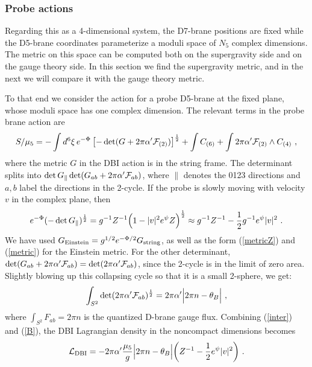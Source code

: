\documentclass[a4paper,12pt]{article}
\renewcommand{\=}[1]{\bar{#1}}
\begin{document}
\subsubsection{Probe actions}

Regarding this as a 4-dimensional system, the D7-brane positions are fixed while
the D5-brane coordinates parameterize a moduli space of
$N_5$ complex dimensions.  The metric on this
space can be computed both on the supergravity side and on the gauge theory
side.
In this section we find the supergravity metric, and in the next we will compare
it with the gauge theory metric.

To that end we consider the action for a probe D5-brane at the fixed plane,
whose moduli space has one complex dimension. The relevant terms in the
probe brane
action are
\begin{equation}
S/\mu_5 =- \int d^6\xi\, e^{-\Phi}\left[-\det(G+2\pi\alpha'{\cal
F}_{(2)})\right]^{\frac{1}{2}}  + \int C_{(6)} + \int 2\pi\alpha'{\cal
F}_{(2)}\wedge C_{(4)}\ ,
\label{action}
\end{equation}
where the metric $G$ in the DBI action is in the string frame. The
determinant splits into $\det G_{\|}\det(G_{ab}+2\pi\alpha'{\cal F}_{ab})$,
where
$\|$ denotes the 0123 directions and $a,b$ label the directions in the
2-cycle. If the probe is slowly moving with velocity $v$ in the complex plane,
then
\begin{equation}
e^{-\Phi}(-\det G_{\|})^{\frac{1}{2}}=
g^{-1} Z^{-1}\Bigl(1-|v|^2 e^{\psi}
Z\Bigr)^{\frac{1}{2}} \approx g^{-1} Z^{-1}-\frac{1}{2}g^{-1}  e^{\psi} |v|^2
\ .
\label{inter}
\end{equation}
We have used $G_{\rm Einstein}=g^{1/2} e^{-\Phi/2}G_{\rm string}$, as well as
the form  (\ref{metricZ}) and (\ref{metric}) for the Einstein metric.
For the other determinant, $\det(G_{ab}+2\pi\alpha'{\cal F}_{ab})=
\det(2\pi\alpha'{\cal F}_{ab})$, since the 2-cycle is in the limit of zero area.
Slightly blowing up this collapsing cycle so that it is a small 2-sphere,
we get:
\begin{equation}
\int_{S^2} \det(2\pi\alpha'{\cal
F}_{ab})^{\frac{1}{2}}= 2\pi \alpha' \Bigl| 2\pi n - \theta_B \Bigr|\ ,
\label{B}
\end{equation}
where $\int_{S^2} F_{ab} = 2\pi n$ is the quantized D-brane gauge flux.
Combining (\ref{inter}) and (\ref{B}), the DBI Lagrangian density in the
noncompact dimensions becomes
\begin{equation}
{\cal L}_{\rm DBI} = - 2\pi \alpha' \frac{\mu_5}{g} \Bigl| 2\pi n - \theta_B
\Bigr| \biggl( Z^{-1} -\frac{1}{2} e^{\psi} |v|^2 \biggr)\ .
\end{equation}
\end{document}
